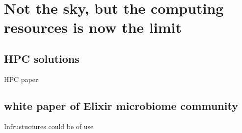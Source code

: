 \chapter{Not the sky, but the computing resources is now the limit}
\label{cha:6}


\section{HPC solutions}

HPC paper


\section{white paper of Elixir microbiome community}


Infrustuctures could be of use

